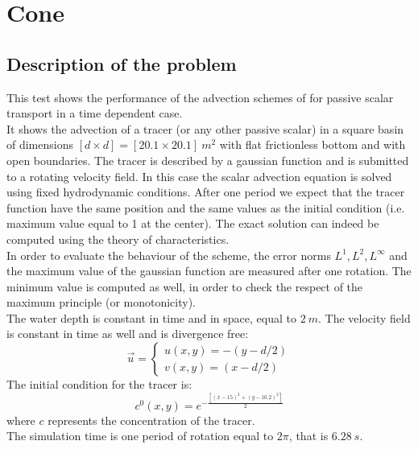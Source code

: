 \chapter{Cone}
%

\section{Description of the problem}
%
This test shows the performance of the advection schemes of  for passive scalar transport in a time dependent case. \\
%
It shows the advection of a tracer (or any other passive scalar) in a square basin of dimensions $[d \times d]=[20.1 \times 20.1]~m^2$ with flat frictionless bottom and with open boundaries. The tracer is described by a gaussian function and is submitted to a rotating velocity field. In this case the scalar advection equation is solved using fixed hydrodynamic conditions. After one period we expect that the tracer function have the same position and the same values as the initial condition (i.e. maximum value equal to 1 at the center). The exact solution can indeed be computed using the theory of characteristics. \\
In order to evaluate the behaviour of the scheme, the error norms $L^1, L^2, L^{\infty}$ and the maximum value of the gaussian function are measured after one rotation. The minimum value is computed as well, in order to check the respect of the maximum principle (or monotonicity). \\
The water depth is constant in time and in space, equal to $2~m$. The velocity field is constant in time as well and is divergence free:
\begin{equation*}
  \vec{u}=\left\{
         \begin{array}{l}
          u(x,y)=-(y-d/2) \\
          v(x,y)=(x-d/2)
         \end{array}\right.
\end{equation*}
The initial condition for the tracer is:
\begin{equation*}
 c^0(x,y)=e^{-\frac{[(x-15)^2+(y-10.2)^2]}{2}}
\end{equation*}
where $c$ represents the concentration of the tracer. \\
The simulation time is one period of rotation equal to $2\pi$, that is $6.28~s$.
%
%
